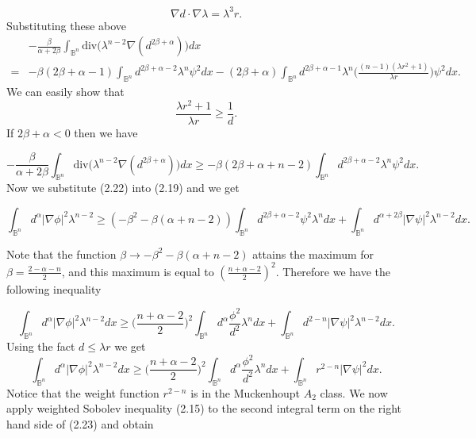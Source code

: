 \documentclass[12pt]{amsart}
\numberwithin{equation}{section}
\numberwithin{theorem}{section}
\numberwithin{theorem}{section} \numberwithin{lemma}{section}
\numberwithin{definition}{section}
\numberwithin{corollary}{section}
\numberwithin{remark}{section}
\numberwithin{proposition}{section}
\begin{document}
\[\nabla d\cdot \nabla \lambda=\lambda^3r.\] Substituting these above
\begin{equation}
\begin{aligned}
&-\frac{\beta}{\alpha+2\beta}
\int_{\mathbb{B}^n}\text{div}\big(\lambda^{n-2}\nabla
(d^{2\beta+\alpha})\big)dx \\ =& -\beta (2\beta
+\alpha-1)\int_{\mathbb{B}^n}d^{2\beta+\alpha-2}\lambda^n\psi^2dx-(2\beta
+\alpha)\int_{\mathbb{B}^n}
d^{2\beta+\alpha-1}\lambda^n\big(\frac{(n-1)(\lambda
r^2+1)}{\lambda r}\big)\psi^2 dx.
\end{aligned}
\end{equation}
We can easily show that \[\frac{\lambda r^2+1}{\lambda r}\ge
\frac{1}{d}.\] If $2\beta+\alpha<0$ then we have

\begin{equation}
-\frac{\beta}{\alpha+2\beta}
\int_{\mathbb{B}^n}\text{div}\big(\lambda^{n-2}\nabla
(d^{2\beta+\alpha})\big)dx \ge
-\beta(2\beta+\alpha+n-2)\int_{\mathbb{B}^n}
d^{2\beta+\alpha-2}\lambda^n\psi^2dx.
\end{equation}
Now we substitute (2.22) into (2.19) and we get

\[\int_{
\mathbb{B}^n}d^{\alpha}|\nabla \phi|^2\lambda^{n-2}\ge
(-\beta^2-\beta(\alpha+n-2)) \int_{
\mathbb{B}^n}d^{2\beta+\alpha-2}\psi^2 \lambda^n
dx+\int_{\mathbb{B}^n} d^{\alpha+2\beta}|\nabla\psi|^2
\lambda^{n-2}dx.\]

Note that the function $\beta\longrightarrow
-\beta^2-\beta(\alpha+n-2)$ attains the maximum for
$\beta=\frac{2-\alpha-n}{2}$, and this maximum is equal to
$(\frac{n+\alpha-2}{2})^2$. Therefore we have the following
inequality

\[\int_{
\mathbb{B}^n}d^{\alpha}|\nabla \phi|^2\lambda^{n-2}dx\ge
\Big(\frac{n+\alpha-2}{2}\Big)^2\int_
{\mathbb{B}^n}d^{\alpha}\frac{\phi^2}{d^2} \lambda^n
dx+\int_{\mathbb{B}^n} d^{2-n}|\nabla\psi|^2 \lambda^{n-2}dx.\] Using the fact $d\le \lambda r$ we get\\
\begin{equation}\int_{ \mathbb{B}^n}d^{\alpha}|\nabla
\phi|^2\lambda^{n-2}dx\ge\Big(\frac{n+\alpha-2}{2}\Big)^2\int_
{\mathbb{B}^n}d^{\alpha}\frac{\phi^2}{d^2} \lambda^n
dx+\int_{\mathbb{B}^n} r^{2-n}|\nabla\psi|^2 dx.\end{equation}
 Notice that the weight
function $r^{2-n}$ is in the Muckenhoupt $A_2$ class. We now apply
weighted Sobolev inequality (2.15) to the second integral term on
the right hand side of (2.23) and obtain
\end{document}
